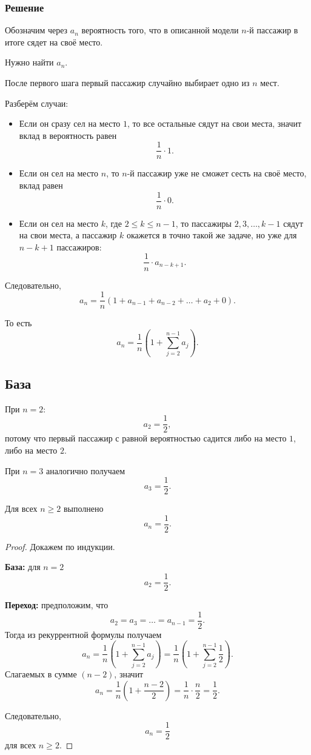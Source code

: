 	\subsubsection*{Решение}
	
	Обозначим через \(a_n\) вероятность того, что в описанной модели \(n\)-й пассажир в итоге сядет на своё место.
	
	Нужно найти \(a_n\).
	
	После первого шага первый пассажир случайно выбирает одно из \(n\) мест.
	
	Разберём случаи:
	
	\begin{itemize}
		\item Если он сразу сел на место \(1\), то все остальные сядут на свои места, значит вклад в вероятность равен
		\[
		\frac1n\cdot 1.
		\]
		
		\item Если он сел на место \(n\), то \(n\)-й пассажир уже не сможет сесть на своё место, вклад равен
		\[
		\frac1n\cdot 0.
		\]
		
		\item Если он сел на место \(k\), где \(2\le k\le n-1\), то пассажиры \(2,3,\dots,k-1\) сядут на свои места, а пассажир \(k\) окажется в точно такой же задаче, но уже для \(n-k+1\) пассажиров:
		\[
		\frac1n\cdot a_{n-k+1}.
		\]
	\end{itemize}
	
	Следовательно,
	\[
	a_n
	=
	\frac1n\left(1+a_{n-1}+a_{n-2}+\dots+a_2+0\right).
	\]
	
	То есть
	\[
	a_n=\frac1n\left(1+\sum_{j=2}^{n-1}a_j\right).
	\]
	
	\subsection*{База}
	
	При \(n=2\):
	\[
	a_2=\frac12,
	\]
	потому что первый пассажир с равной вероятностью садится либо на место \(1\), либо на место \(2\).
	
	При \(n=3\) аналогично получаем
	\[
	a_3=\frac12.
	\]
	
	\begin{Proposition}{}{}
		Для всех \(n\ge 2\) выполнено
		\[
		a_n=\frac12.
		\]
	\end{Proposition}
	
	\begin{proof}
		Докажем по индукции.
		
		\textbf{База:} для \(n=2\)
		\[
		a_2=\frac12.
		\]
		
		\textbf{Переход:} предположим, что
		\[
		a_2=a_3=\dots=a_{n-1}=\frac12.
		\]
		Тогда из рекуррентной формулы получаем
		\[
		a_n
		=
		\frac1n\left(1+\sum_{j=2}^{n-1}a_j\right)
		=
		\frac1n\left(1+\sum_{j=2}^{n-1}\frac12\right).
		\]
		Слагаемых в сумме \((n-2)\), значит
		\[
		a_n
		=
		\frac1n\left(1+\frac{n-2}{2}\right)
		=
		\frac1n\cdot\frac{n}{2}
		=
		\frac12.
		\]
		
		Следовательно,
		\[
		a_n=\frac12
		\]
		для всех \(n\ge 2\).
	\end{proof}


